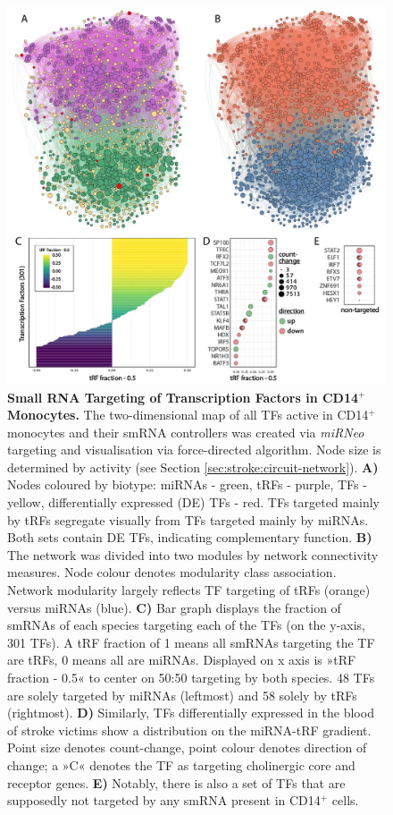 \begin{figure}
\includegraphics[width=\textwidth]{figures/smrna-tf-network-fractions}
\caption[Small RNA Targeting of Transcription Factors in CD14$^+$ Monocytes.]{\textbf{Small RNA Targeting of Transcription Factors in CD14$^+$ Monocytes.} The two-dimensional map of all TFs active in CD14$^+$ monocytes and their smRNA controllers was created via \emph{miRNeo} targeting and visualisation via force-directed algorithm. Node size is determined by activity (see Section \ref{sec:stroke:circuit-network}). \textbf{A)} Nodes coloured by biotype: miRNAs - green, tRFs - purple, TFs - yellow, differentially expressed (DE) TFs - red. TFs targeted mainly by tRFs segregate visually from TFs targeted mainly by miRNAs. Both sets contain DE TFs, indicating complementary function. \textbf{B)} The network was divided into two modules by network connectivity measures. Node colour denotes modularity class association. Network modularity largely reflects TF targeting of tRFs (orange) versus miRNAs (blue). \textbf{C)} Bar graph displays the fraction of smRNAs of each species targeting each of the TFs (on the y-axis, 301 TFs). A tRF fraction of 1 means all smRNAs targeting the TF are tRFs, 0 means all are miRNAs. Displayed on x axis is »tRF fraction - 0.5« to center on 50:50 targeting by both species. 48 TFs are solely targeted by miRNAs (leftmost) and 58 solely by tRFs (rightmost). \textbf{D)} Similarly, TFs differentially expressed in the blood of stroke victims show a distribution on the miRNA-tRF gradient. Point size denotes count-change, point colour denotes direction of change; a »C« denotes the TF as targeting cholinergic core and receptor genes. \textbf{E)} Notably, there is also a set of TFs that are supposedly not targeted by any smRNA present in CD14$^+$ cells.
\label{fig:smrna-tf-network-fractions}}
\end{figure}


